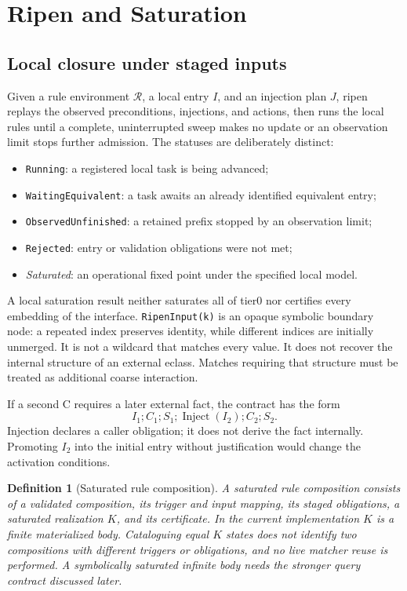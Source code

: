 \documentclass[11pt,a4paper]{article}
\newtheorem{definition}{Definition}
\newcommand{\code}[1]{\texttt{#1}}
\begin{document}
\section{Ripen and Saturation}
\subsection{Local closure under staged inputs}
Given a rule environment $\mathcal R$, a local entry $I$, and an injection plan
$J$, ripen replays the observed preconditions, injections, and actions, then runs
the local rules until a complete, uninterrupted sweep makes no update or an
observation limit stops further admission.
The statuses are deliberately distinct:
\begin{itemize}
\item \code{Running}: a registered local task is being advanced;
\item \code{WaitingEquivalent}: a task awaits an already identified equivalent entry;
\item \code{ObservedUnfinished}: a retained prefix stopped by an observation limit;
\item \code{Rejected}: entry or validation obligations were not met;
\item \emph{Saturated}: an operational fixed point under the specified local model.
\end{itemize}

A local saturation result neither saturates all of tier0 nor certifies every embedding
of the interface. \code{RipenInput(k)} is an opaque symbolic boundary node: a
repeated index preserves identity, while different indices are initially
unmerged. It is not a wildcard that matches every value. It does not recover the
internal structure of an external eclass. Matches requiring that structure must
be treated as additional coarse interaction.

If a second C requires a later external fact, the contract has the form
\begin{equation}
 I_1;C_1;S_1;\operatorname{Inject}(I_2);C_2;S_2.
\end{equation}
Injection declares a caller obligation; it does not derive the fact internally.
Promoting $I_2$ into the initial entry without justification would change the
activation conditions.

\begin{definition}[Saturated rule composition]
A saturated rule composition consists of a validated composition, its trigger
and input mapping, its staged obligations, a saturated realization $K$, and its
certificate. In the current implementation $K$ is a finite materialized body.
Cataloguing equal $K$ states does not identify two compositions with different triggers or
obligations, and no live matcher reuse is performed. A symbolically saturated infinite body needs the stronger query
contract discussed later.
\end{definition}
\MathSaturated
\end{document}
